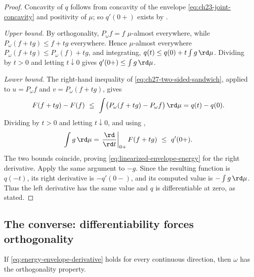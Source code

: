 \begin{proof}
Concavity of $q$ follows from concavity of the envelope
\eqref{eq:ch23-joint-concavity} and positivity of $\mu$; so $q'(0+)$
exists by .

\emph{Upper bound.}  By orthogonality, $P_\omega f=f$ $\mu$-almost
everywhere, while $P_\omega(f+tg)\leq f+tg$ everywhere.  Hence
$\mu$-almost everywhere
$P_\omega(f+tg)\leq P_\omega(f)+tg$, and integrating,
$q(t)\leq q(0)+t\int g\,\rd\mu$.  Dividing by $t>0$ and letting
$t\downarrow0$ gives $q'(0+)\leq\int g\,\rd\mu$.

\emph{Lower bound.}  The right-hand inequality of
\eqref{eq:ch27-two-sided-sandwich}, applied to
$u=P_\omega f$ and $v=P_\omega(f+tg)$, gives
\[
 F(f+tg)-F(f)\ \leq\ \int\bigl(P_\omega(f+tg)-P_\omega f\bigr)\,\rd\mu
 =q(t)-q(0).
\]
Dividing by $t>0$ and letting $t\downarrow0$, and using
,
\[
 \int g\,\rd\mu
 =\left.\frac{\rd}{\rd t}\right|_{0+}F(f+tg)
 \ \leq\ q'(0+).
\]
The two bounds coincide, proving
\eqref{eq:linearized-envelope-energy} for the right derivative.
Apply the same argument to $-g$.  Since the resulting function is $q(-t)$,
its right derivative is $-q'(0-)$, and its computed value is
$-\int g\,\rd\mu$.  Thus the left derivative has the same value and
$q$ is differentiable at zero, as stated.
\end{proof}

\subsection{The converse: differentiability forces orthogonality}
\label{sec:ch27-converse}

\begin{proposition}\label{prop:differentiability-iff-orthogonality}
If \eqref{eq:energy-envelope-derivative} holds for every continuous
direction, then $\omega$ has the orthogonality property.
\end{proposition}

